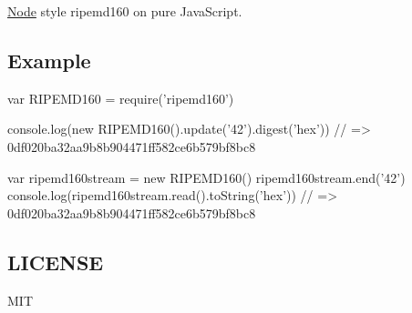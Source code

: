 \href{https://www.npmjs.org/package/ripemd160}{\tt } \href{https://travis-ci.org/crypto-browserify/ripemd160}{\tt } \href{https://david-dm.org/crypto-browserify/ripemd160#info=dependencies}{\tt }

\href{https://github.com/feross/standard}{\tt }

\mbox{\hyperlink{classNode}{Node}} style {\ttfamily ripemd160} on pure Java\+Script.

\subsection*{Example}


\begin{DoxyCode}
var RIPEMD160 = require('ripemd160')

console.log(new RIPEMD160().update('42').digest('hex'))
// => 0df020ba32aa9b8b904471ff582ce6b579bf8bc8

var ripemd160stream = new RIPEMD160()
ripemd160stream.end('42')
console.log(ripemd160stream.read().toString('hex'))
// => 0df020ba32aa9b8b904471ff582ce6b579bf8bc8
\end{DoxyCode}


\subsection*{L\+I\+C\+E\+N\+SE}

M\+IT 